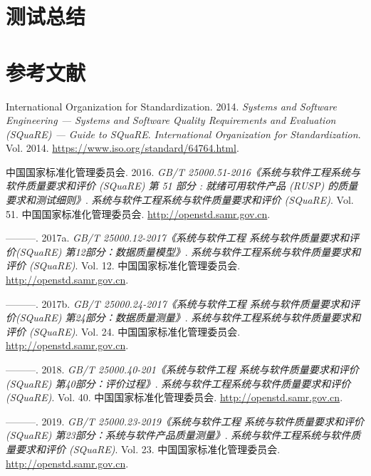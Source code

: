 \documentclass[hyperref, a4paper]{ctexart}
\begin{document}
\hypertarget{ux6d4bux8bd5ux603bux7ed3}{%
\section{测试总结}\label{ux6d4bux8bd5ux603bux7ed3}}

\pagebreak

\hypertarget{ux53c2ux8003ux6587ux732e}{%
\section*{参考文献}\label{ux53c2ux8003ux6587ux732e}}

\hypertarget{refs}{}
\leavevmode\hypertarget{ref-innovativeInternationalisation}{}%
International Organization for Standardization. 2014. \emph{Systems and
Software Engineering --- Systems and Software Quality Requirements and
Evaluation (SQuaRE) --- Guide to SQuaRE}. \emph{International
Organization for Standardization}. Vol. 2014.
\url{https://www.iso.org/standard/64764.html}.

\leavevmode\hypertarget{ref-innovative1}{}%
中国国家标准化管理委员会. 2016. \emph{GB/T
25000.51-2016《系统与软件工程系统与软件质量要求和评价 (SQuaRE) 第 51
部分 : 就绪可用软件产品 (RUSP) 的质量要求和测试细则》}.
\emph{系统与软件工程系统与软件质量要求和评价 (SQuaRE)}. Vol. 51.
中国国家标准化管理委员会. \url{http://openstd.samr.gov.cn}.

\leavevmode\hypertarget{ref-innovative3}{}%
---------. 2017a. \emph{GB/T 25000.12-2017《系统与软件工程
系统与软件质量要求和评价(SQuaRE) 第12部分：数据质量模型》}.
\emph{系统与软件工程系统与软件质量要求和评价 (SQuaRE)}. Vol. 12.
中国国家标准化管理委员会. \url{http://openstd.samr.gov.cn}.

\leavevmode\hypertarget{ref-innovative4}{}%
---------. 2017b. \emph{GB/T 25000.24-2017《系统与软件工程
系统与软件质量要求和评价(SQuaRE) 第24部分：数据质量测量》}.
\emph{系统与软件工程系统与软件质量要求和评价 (SQuaRE)}. Vol. 24.
中国国家标准化管理委员会. \url{http://openstd.samr.gov.cn}.

\leavevmode\hypertarget{ref-innovative5}{}%
---------. 2018. \emph{GB/T 25000.40-201《系统与软件工程
系统与软件质量要求和评价(SQuaRE) 第40部分：评价过程》}.
\emph{系统与软件工程系统与软件质量要求和评价 (SQuaRE)}. Vol. 40.
中国国家标准化管理委员会. \url{http://openstd.samr.gov.cn}.

\leavevmode\hypertarget{ref-innovative2}{}%
---------. 2019. \emph{GB/T 25000.23-2019《系统与软件工程
系统与软件质量要求和评价(SQuaRE) 第23部分：系统与软件产品质量测量》}.
\emph{系统与软件工程系统与软件质量要求和评价 (SQuaRE)}. Vol. 23.
中国国家标准化管理委员会. \url{http://openstd.samr.gov.cn}.
\end{document}
